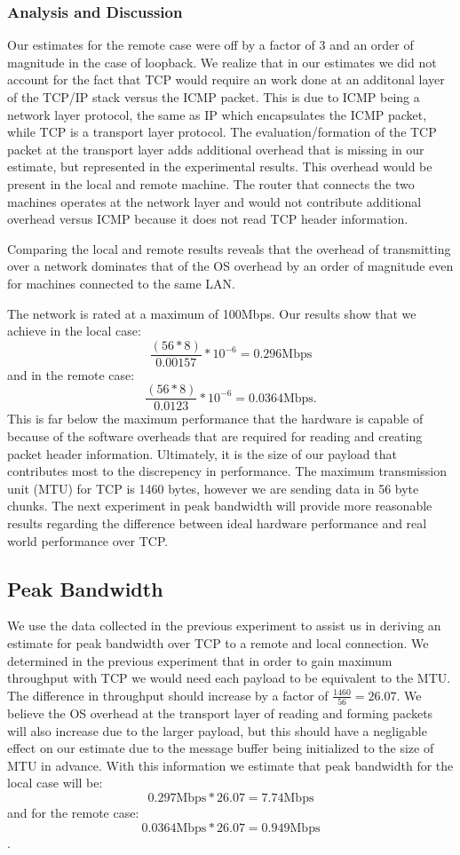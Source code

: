 \subsubsection{Analysis and Discussion}

Our estimates for the remote case were off by a factor of 3 and an order of
magnitude in the case of loopback. We realize that in our estimates we did not
account for the fact that TCP would require an work done at an additonal layer
of the TCP/IP stack versus the ICMP packet. This is due to ICMP being a network 
layer protocol, the same as IP which encapsulates the ICMP packet, while TCP is 
a transport layer protocol. The evaluation/formation of the TCP packet at the
transport layer adds additional overhead that is missing in our estimate, but 
represented in the experimental results. This overhead would be present in the 
local and remote machine. The router that connects the two machines operates 
at the network layer and would not contribute additional overhead versus ICMP 
because it does not read TCP header information.

Comparing the local and remote results reveals that the overhead of transmitting
over a network dominates that of the OS overhead by an order of magnitude 
even for machines connected to the same LAN.

The network is rated at a maximum of 100Mbps. Our results show that we achieve in 
the local case: $$\frac{(56*8)}{0.00157} * 10^{-6} = 0.296\text{Mbps}$$
and in the remote case: $$\frac{(56*8)}{0.0123} * 10^{-6} = 0.0364\text{Mbps}.$$
This is far below the maximum performance that the hardware is capable of because of
 the software overheads that are required for reading and creating packet header information.
Ultimately, it is the size of our payload that contributes most to the discrepency 
in performance. The maximum transmission unit (MTU) for TCP is 1460 bytes, 
however we are sending data in 56 byte chunks. The next experiment in peak bandwidth 
will provide more reasonable results regarding the difference between ideal 
hardware performance and real world performance over TCP.

\subsection{Peak Bandwidth}

We use the data collected in the previous experiment to assist us in
deriving an estimate for peak bandwidth over TCP to a remote and local
connection. We determined in the previous experiment that in order to 
gain maximum throughput with TCP we would need each payload to be 
equivalent to the MTU. The difference in throughput should increase 
by a factor of $\frac{1460}{56} = 26.07$. We believe the OS overhead at the transport 
layer of reading and forming packets will also increase due to the larger payload, but 
this should have a negligable effect on our estimate due to the message buffer being 
initialized to the size of MTU in advance. With this information we estimate that 
peak bandwidth for the local case will be: $$0.297\text{Mbps} * 26.07 = 7.74\text{Mbps}$$
and for the remote case: $$0.0364\text{Mbps} * 26.07 = 0.949\text{Mbps}$$.

